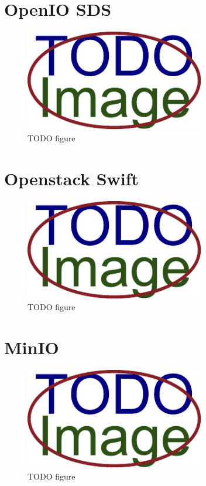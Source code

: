 \section{OpenIO SDS}
    \textcolor{gray}{\Blindtext}
    \begin{figure}[hbt]
        \centering
        \includegraphics[width=0.7\textwidth]{obrazky-figures/placeholder.pdf}
        \caption{TODO figure}
    \end{figure}
\section{Openstack Swift}
    \textcolor{gray}{\Blindtext}
    \begin{figure}[hbt]
        \centering
        \includegraphics[width=0.7\textwidth]{obrazky-figures/placeholder.pdf}
        \caption{TODO figure}
    \end{figure}
\section{MinIO}
    \textcolor{gray}{\Blindtext}
    \begin{figure}[hbt]
        \centering
        \includegraphics[width=0.7\textwidth]{obrazky-figures/placeholder.pdf}
        \caption{TODO figure}
    \end{figure}

